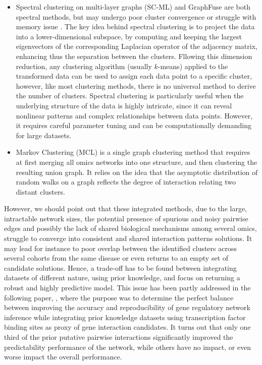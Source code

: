 \documentclass[mainlanguage=english,numlaboratories=2, nofrontcover=true,noaim=false, localbibs, colophon-location=verso-frontcover, oneside, 10pt, localtocs, version=final, nomakeabstract=true]{yathesis}
\begin{document}
\begin{itemize}
\item Spectral clustering on multi-layer graphs (SC-ML) \autocite{dong_etal14} and GraphFuse \autocite{papalexakis_etal13} are both spectral methods, but may undergo poor cluster convergence or struggle with memory issue \autocite{malod-dognin_etal19}. The key idea behind spectral clustering is to project the data into a lower-dimensional subspace, by computing and keeping the largest eigenvectors of the corresponding Laplacian operator of the adjacency matrix, enhancing thus the separation between the clusters. Fllowing this dimension reduction, any clustering algorithm (usually $k$-means) applied to the transformed data can be used to assign each data point to a specific cluster, however, like most clustering methods, there is no universal method to derive the number of clusters. Spectral clustering is particularly useful when the underlying structure of the data is highly intricate, since it can reveal nonlinear patterns and complex relationships between data points. However, it requires careful parameter tuning and can be computationally demanding for large datasets. 

\item Markov Clustering (MCL) \autocite{enright_etal02} is a single graph clustering method that requires at first merging all omics networks into one structure, and then clustering the resulting union graph. It relies on the idea that the asymptotic distribution of random walks on a graph reflects the degree of interaction relating two distant clusters.
\end{itemize}

However, we should point out that these integrated methods, due to the large, intractable network sizes, the potential presence of spurious and noisy pairwise edges and possibly the lack of shared biological mechanisms among several omics, struggle to converge into consistent and shared interaction patterns solutions. It may lead for instance to poor overlap between the identified clusters  across several cohorts from the same disease or even returns to an empty set of candidate solutions. Hence, a trade-off has to be found between integrating datasets of different nature, using prior knowledge, and focus on returning a robust and highly predictive model. This issue has been partly addressed in the following paper, , where the purpose was to determine the perfect balance between improving the accuracy and reproducibility of gene regulatory network inference while integrating prior knowledge datasets using transcription factor binding sites as proxy of gene interaction candidates. It turns out that only one third of the prior putative pairwise interactions significantly improved the predictability performance of the network, while others have no impact, or even worse impact the overall performance.
\end{document}
